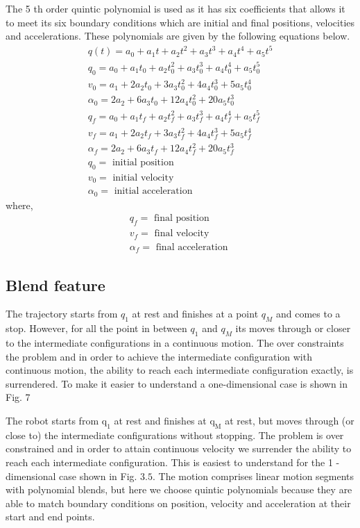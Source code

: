 \documentclass{UoNMCHA}
\numberwithin{equation}{section}
\begin{document}
The 5 th order quintic polynomial is used as it has six coefficients that allows it to meet its six boundary
conditions which are initial and final positions, velocities and accelerations. These polynomials are
given by the following equations below.
$$
\begin{array}{c}
q(t)=a_{0}+a_{1} t+a_{2} t^{2}+a_{3} t^{3}+a_{4} t^{4}+a_{5} t^{5} \\
q_{0}=a_{0}+a_{1} t_{0}+a_{2} t_{0}^{2}+a_{3} t_{0}^{3}+a_{4} t_{0}^{4}+a_{5} t_{0}^{5} \\
v_{0}=a_{1}+2 a_{2} t_{0}+3 a_{3} t_{0}^{2}+4 a_{4} t_{0}^{3}+5 a_{5} t_{0}^{4} \\
\alpha_{0}=2 a_{2}+6 a_{3} t_{0}+12 a_{4} t_{0}^{2}+20 a_{5} t_{0}^{3} \\
q_{f}=a_{0}+a_{1} t_{f}+a_{2} t_{f}^{2}+a_{3} t_{f}^{3}+a_{4} t_{f}^{4}+a_{5} t_{f}^{5} \\
v_{f}=a_{1}+2 a_{2} t_{f}+3 a_{3} t_{f}^{2}+4 a_{4} t_{f}^{3}+5 a_{5} t_{f}^{4} \\
\alpha_{f}=2 a_{2}+6 a_{3} t_{f}+12 a_{4} t_{f}^{2}+20 a_{5} t_{f}^{3} \\
q_{0}=\text { initial position } \\
v_{0}=\text { initial velocity } \\
\alpha_{0}=\text { initial acceleration }
\end{array}
$$
where,
$$
\begin{array}{l}
q_{f}=\text { final position } \\
v_{f}=\text { final velocity } \\
\alpha_{f}=\text { final acceleration }
\end{array}
$$
\subsection{Blend feature} 
The trajectory starts from $q_{1}$ at rest and finishes at a point $q_{M}$ and comes to a stop. However, for all the
point in between $q_{1}$ and $q_{M}$ its moves through or closer to the intermediate configurations in a
continuous motion. The over constraints the problem and in order to achieve the intermediate
configuration with continuous motion, the ability to reach each intermediate configuration exactly, is
surrendered. To make it easier to understand a one-dimensional case is shown in Fig. 7

The robot starts from $\mathrm{q}_{1}$ at rest and finishes at $\mathrm{q}_{\mathrm{M}}$ at rest, but moves through (or close to) the
intermediate configurations without stopping. The problem is over constrained and in order to attain
continuous velocity we surrender the ability to reach each intermediate configuration. This is easiest to
understand for the 1 -dimensional case shown in Fig. $3.5 .$ The motion comprises linear motion segments
with polynomial blends, but here we choose quintic polynomials because they are able to match
boundary conditions on position, velocity and acceleration at their start and end points.
\end{document}
